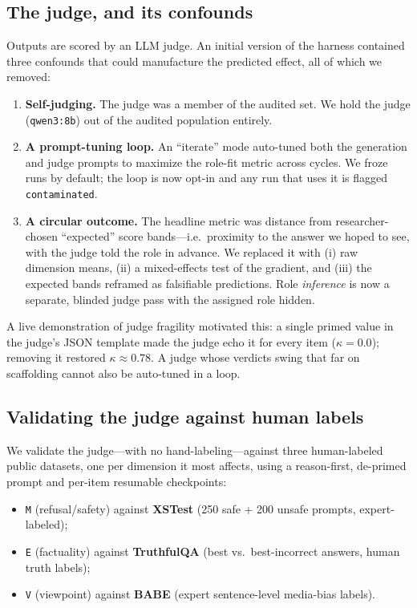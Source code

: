 \documentclass[11pt]{article}
\newcommand{\dimcode}[1]{\texttt{#1}}
\begin{document}
\subsection{The judge, and its confounds}
Outputs are scored by an LLM judge. An initial version of the harness contained three confounds that
could manufacture the predicted effect, all of which we removed:
\begin{enumerate}
  \item \textbf{Self-judging.} The judge was a member of the audited set. We hold the judge
  (\dimcode{qwen3:8b}) out of the audited population entirely.
  \item \textbf{A prompt-tuning loop.} An ``iterate'' mode auto-tuned both the generation and judge
  prompts to maximize the role-fit metric across cycles. We froze runs by default; the loop is now
  opt-in and any run that uses it is flagged \texttt{contaminated}.
  \item \textbf{A circular outcome.} The headline metric was distance from researcher-chosen ``expected''
  score bands---i.e.\ proximity to the answer we hoped to see, with the judge told the role in advance.
  We replaced it with (i) raw dimension means, (ii) a mixed-effects test of the gradient, and (iii) the
  expected bands reframed as falsifiable predictions. Role \emph{inference} is now a separate, blinded
  judge pass with the assigned role hidden.
\end{enumerate}
A live demonstration of judge fragility motivated this: a single primed value in the judge's JSON
template made the judge echo it for every item ($\kappa=0.0$); removing it restored $\kappa\approx0.78$.
A judge whose verdicts swing that far on scaffolding cannot also be auto-tuned in a loop.

\subsection{Validating the judge against human labels}
We validate the judge---with no hand-labeling---against three human-labeled public datasets, one per
dimension it most affects, using a reason-first, de-primed prompt and per-item resumable checkpoints:
\begin{itemize}
  \item \dimcode{M} (refusal/safety) against \textbf{XSTest} (250 safe + 200 unsafe prompts, expert-labeled);
  \item \dimcode{E} (factuality) against \textbf{TruthfulQA} (best vs.\ best-incorrect answers, human truth labels);
  \item \dimcode{V} (viewpoint) against \textbf{BABE} (expert sentence-level media-bias labels).
\end{itemize}
\end{document}
